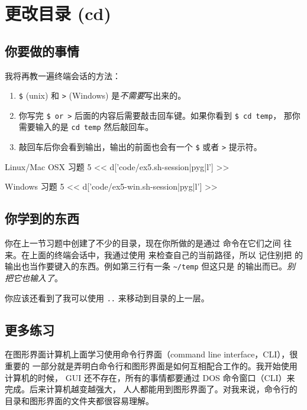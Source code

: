 \chapter{更改目录 (cd)}

\section{你要做的事情}

我将再教一遍终端会话的方法：

\begin{enumerate} 
\item \verb|$| (unix) 和 \verb|>| (Windows) 是\emph{不需要}写出来的。
\item 你写完 \verb|$ or >| 后面的内容后需要敲击回车键。如果你看到 \verb|$ cd temp|，
那你需要输入的是 \verb|cd temp| 然后敲回车。
\item 敲回车后你会看到输出，输出的前面也会有一个 \verb|$| 或者 \verb|>| 提示符。
\end{enumerate}

\begin{code}{Linux/Mac OSX 习题 5}
<< d['code/ex5.sh-session|pyg|l'] >>
\end{code}

\begin{code}{Windows 习题 5}
<< d['code/ex5-win.sh-session|pyg|l'] >>
\end{code}

\section{你学到的东西}

你在上一节习题中创建了不少的目录，现在你所做的是通过  命令在它们之间
往来。在上面的终端会话中，我通过使用  来检查自己的当前路径，所以
记住别把  的输出也当作要键入的东西。例如第三行有一条 \verb|~/temp| 
但这只是  的输出而已。\emph{别把它也输入了}。

你应该还看到了我可以使用 \verb|..| 来移动到目录的上一层。


\section{更多练习}

在图形界面计算机上面学习使用命令行界面（command line interface，CLI），很重要的
一部分就是弄明白命令行和图形界面是如何互相配合工作的。我开始使用计算机的时候，
GUI 还不存在，所有的事情都要通过 DOS 命令窗口（CLI）来完成。后来计算机越变越强大，
人人都能用到图形界面了。对我来说，命令行的目录和图形界面的文件夹都很容易理解。

